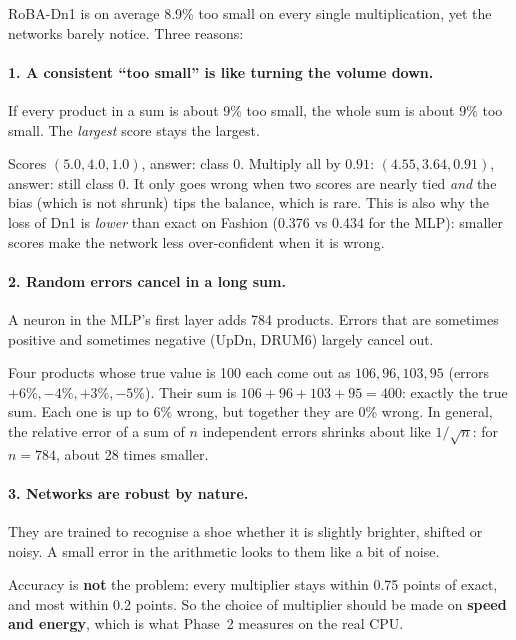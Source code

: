 RoBA-Dn1 is on average 8.9\% too small on every single multiplication, yet the networks barely notice.
Three reasons:

\paragraph{1. A consistent ``too small'' is like turning the volume down.} If every product in a sum is
about 9\% too small, the whole sum is about 9\% too small. The \emph{largest} score stays the largest.
\begin{example}
Scores $(5.0, 4.0, 1.0)$, answer: class 0. Multiply all by $0.91$: $(4.55, 3.64, 0.91)$, answer: still
class 0. It only goes wrong when two scores are nearly tied \emph{and} the bias (which is not shrunk)
tips the balance, which is rare. This is also why the loss of Dn1 is \emph{lower} than exact on Fashion
(0.376 vs 0.434 for the MLP): smaller scores make the network less over-confident when it is wrong.
\end{example}

\paragraph{2. Random errors cancel in a long sum.} A neuron in the MLP's first layer adds 784 products.
Errors that are sometimes positive and sometimes negative (UpDn, DRUM6) largely cancel out.
\begin{example}
Four products whose true value is 100 each come out as $106, 96, 103, 95$ (errors $+6\%, -4\%,
+3\%, -5\%$). Their sum is $106+96+103+95 = 400$: exactly the true sum. Each one is up to 6\% wrong,
but together they are 0\% wrong. In general, the
relative error of a sum of $n$ independent errors shrinks about like $1/\sqrt{n}$: for $n=784$, about 28
times smaller.
\end{example}

\paragraph{3. Networks are robust by nature.} They are trained to recognise a shoe whether it is
slightly brighter, shifted or noisy. A small error in the arithmetic looks to them like a bit of noise.

\begin{keyidea}
Accuracy is \textbf{not} the problem: every multiplier stays within 0.75 points of exact, and most within
0.2 points. So the choice of multiplier should be made on \textbf{speed and energy}, which is what Phase~2
measures on the real CPU.
\end{keyidea}

